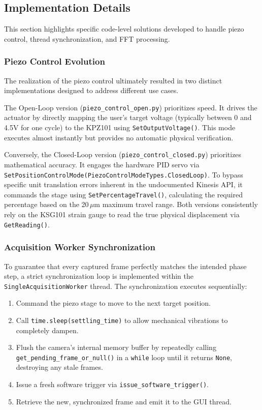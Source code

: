 \documentclass[12pt,a4paper]{article}
\begin{document}
    \subsection{Implementation Details}
    This section highlights specific code-level solutions developed to handle piezo control, thread synchronization, and FFT processing.
    
        \subsubsection{Piezo Control Evolution}
            The realization of the piezo control ultimately resulted in two distinct implementations designed to address different use cases. 
            
            The Open-Loop version (\texttt{piezo\_control\_open.py}) prioritizes speed. It drives the actuator by directly mapping the user's target voltage (typically between 0 and 4.5V for one cycle) to the \ac{KPZ101} using \texttt{SetOutputVoltage()}. This mode executes almost instantly but provides no automatic physical verification.
            
            Conversely, the Closed-Loop version (\texttt{piezo\_control\_closed.py}) prioritizes mathematical accuracy. It engages the hardware PID servo via \texttt{SetPositionControlMode(PiezoControlModeTypes.ClosedLoop)}. To bypass specific unit translation errors inherent in the undocumented Kinesis API, it commands the stage using \texttt{SetPercentageTravel()}, calculating the required percentage based on the 20\,$\mu$m maximum travel range. Both versions consistently rely on the KSG101 strain gauge to read the true physical displacement via \texttt{GetReading()}.

        \subsubsection{Acquisition Worker Synchronization}
            To guarantee that every captured frame perfectly matches the intended phase step, a strict synchronization loop is implemented within the \texttt{SingleAcquisitionWorker} thread. The synchronization executes sequentially:
            \begin{enumerate}
                \item Command the piezo stage to move to the next target position.
                \item Call \texttt{time.sleep(settling\_time)} to allow mechanical vibrations to completely dampen.
                \item Flush the camera's internal memory buffer by repeatedly calling \texttt{get\_pending\_frame\_or\_null()} in a \texttt{while} loop until it returns \texttt{None}, destroying any stale frames.
                \item Issue a fresh software trigger via \texttt{issue\_software\_trigger()}.
                \item Retrieve the new, synchronized frame and emit it to the \ac{GUI} thread.
            \end{enumerate}
\end{document}
